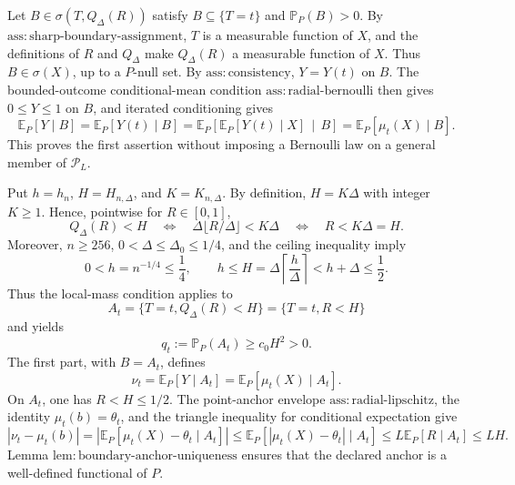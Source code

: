 Let \(B\in\sigma(T,Q_\Delta(R))\) satisfy \(B\subseteq\{T=t\}\) and \(\mathbb P_P(B)>0\).  By \(\mathrm{ass:sharp\text{-}boundary\text{-}assignment}\), \(T\) is a measurable function of \(X\), and the definitions of \(R\) and \(Q_\Delta\) make \(Q_\Delta(R)\) a measurable function of \(X\).  Thus \(B\in\sigma(X)\), up to a \(P\)-null set.  By \(\mathrm{ass:consistency}\), \(Y=Y(t)\) on \(B\).  The bounded-outcome conditional-mean condition \(\mathrm{ass:radial\text{-}bernoulli}\) then gives \(0\leq Y\leq1\) on \(B\), and iterated conditioning gives
\[
 \mathbb E_P[Y\mid B]
 =\mathbb E_P[Y(t)\mid B]
 =\mathbb E_P\!\left[\mathbb E_P[Y(t)\mid X]\,\middle|\,B\right]
 =\mathbb E_P[\mu_t(X)\mid B].
\]
This proves the first assertion without imposing a Bernoulli law on a general member of \(\mathcal P_L\).

Put \(h=h_n\), \(H=H_{n,\Delta}\), and \(K=K_{n,\Delta}\).  By definition, \(H=K\Delta\) with integer \(K\geq1\).  Hence, pointwise for \(R\in[0,1]\),
\[
 Q_\Delta(R)<H
 \quad\Longleftrightarrow\quad
 \Delta\lfloor R/\Delta\rfloor<K\Delta
 \quad\Longleftrightarrow\quad
 R<K\Delta=H.
\]
Moreover, \(n\geq256\), \(0<\Delta\leq\Delta_0\leq1/4\), and the ceiling inequality imply
\[
 0<h=n^{-1/4}\leq\frac14,
 \qquad
 h\leq H=\Delta\left\lceil\frac h\Delta\right\rceil<h+\Delta\leq\frac12.
\]
Thus the local-mass condition applies to
\[
 A_t=\{T=t,Q_\Delta(R)<H\}=\{T=t,R<H\}
\]
and yields
\[
 q_t:=\mathbb P_P(A_t)\geq c_0H^2>0.
\]
The first part, with \(B=A_t\), defines
\[
 \nu_t=\mathbb E_P[Y\mid A_t]
      =\mathbb E_P[\mu_t(X)\mid A_t].
\]
On \(A_t\), one has \(R<H\leq1/2\).  The point-anchor envelope \(\mathrm{ass:radial\text{-}lipschitz}\), the identity \(\mu_t(b)=\theta_t\), and the triangle inequality for conditional expectation give
\[
 \left|\nu_t-\mu_t(b)\right|
 =\left|\mathbb E_P[\mu_t(X)-\theta_t\mid A_t]\right|
 \leq\mathbb E_P[|\mu_t(X)-\theta_t|\mid A_t]
 \leq L\mathbb E_P[R\mid A_t]
 \leq LH.
\]
Lemma \(\mathrm{lem:boundary\text{-}anchor\text{-}uniqueness}\) ensures that the declared anchor is a well-defined functional of \(P\).

